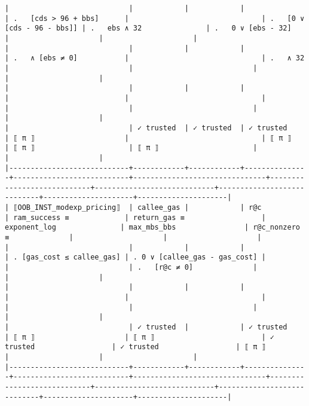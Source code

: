 \documentclass[varwidth=\maxdimen,margin=0.5cm,multi={verbatim}]{standalone}
\begin{document}
\begin{verbatim}
|                            |            |            |               | .   [cds > 96 + bbs]      |                               | .   [0 ∨ [cds - 96 - bbs]] | .   ebs ∧ 32               | .   0 ∨ [ebs - 32]         |                     |                     |
|                            |            |            |               | .   ∧ [ebs ≠ 0]           |                               | .   ∧ 32                   |                            |                            |                     |                     |
|                            |            |            |               |                           |                               |                            |                            |                            |                     |                     |
|                            | ✓ trusted  | ✓ trusted  | ✓ trusted     | ⟦ π ⟧                     |                               | ⟦ π ⟧                      | ⟦ π ⟧                      | ⟦ π ⟧                      |                     |                     |
|----------------------------+------------+------------+---------------+---------------------------+-------------------------------+----------------------------+----------------------------+----------------------------+---------------------+---------------------|
| ⟦OOB_INST_modexp_pricing⟧  | callee_gas |            | r@c           | ram_success ≡             | return_gas ≡                  | exponent_log               | max_mbs_bbs                | r@c_nonzero ≡              |                     |                     |
|                            |            |            |               | . [gas_cost ≤ callee_gas] | . 0 ∨ [callee_gas - gas_cost] |                            |                            | .   [r@c ≠ 0]              |                     |                     |
|                            |            |            |               |                           |                               |                            |                            |                            |                     |                     |
|                            | ✓ trusted  |            | ✓ trusted     | ⟦ π ⟧                     | ⟦ π ⟧                         | ✓ trusted                  | ✓ trusted                  | ⟦ π ⟧                      |                     |                     |
|----------------------------+------------+------------+---------------+---------------------------+-------------------------------+----------------------------+----------------------------+----------------------------+---------------------+---------------------|

\end{verbatim}
\end{document}
